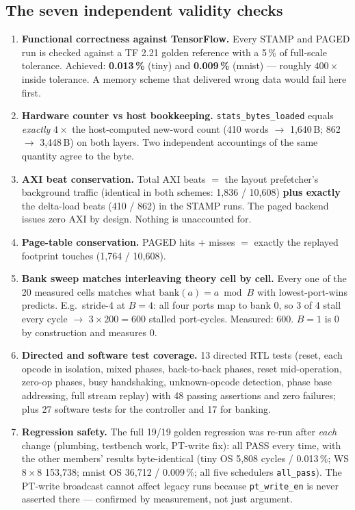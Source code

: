 \documentclass[11pt,a4paper]{article}
\newcommand{\file}[1]{\texttt{\small #1}}
\begin{document}
\subsection{The seven independent validity checks}

\begin{enumerate}[leftmargin=1.6em,itemsep=4pt]
  \item \textbf{Functional correctness against TensorFlow.} Every STAMP and
        PAGED run is checked against a TF 2.21 golden reference with a 5\,\%
        of full-scale tolerance. Achieved: \textbf{0.013\,\%} (tiny) and
        \textbf{0.009\,\%} (mnist) --- roughly $400\times$ inside tolerance. A
        memory scheme that delivered wrong data would fail here first.
  \item \textbf{Hardware counter vs host bookkeeping.}
        \file{stats\_bytes\_loaded} equals \emph{exactly} $4 \times$ the
        host-computed new-word count (410 words $\to$ 1{,}640\,B;
        862 $\to$ 3{,}448\,B) on both layers. Two independent accountings of
        the same quantity agree to the byte.
  \item \textbf{AXI beat conservation.} Total AXI beats $=$ the layout
        prefetcher's background traffic (identical in both schemes: 1{,}836 /
        10{,}608) \textbf{plus exactly} the delta-load beats (410 / 862) in the
        STAMP runs. The paged backend issues zero AXI by design. Nothing is
        unaccounted for.
  \item \textbf{Page-table conservation.} PAGED hits $+$ misses $=$ exactly the
        replayed footprint touches (1{,}764 / 10{,}608).
  \item \textbf{Bank sweep matches interleaving theory cell by cell.} Every one
        of the 20 measured cells matches what $\text{bank}(a) = a \bmod B$ with
        lowest-port-wins predicts. E.g.\ stride-4 at $B{=}4$: all four ports map
        to bank 0, so 3 of 4 stall every cycle $\to$ $3 \times 200 = 600$
        stalled port-cycles. Measured: 600. $B{=}1$ is 0 by construction and
        measures 0.
  \item \textbf{Directed and software test coverage.} 13 directed RTL tests
        (reset, each opcode in isolation, mixed phases, back-to-back phases,
        reset mid-operation, zero-op phases, busy handshaking, unknown-opcode
        detection, phase base addressing, full stream replay) with 48 passing
        assertions and zero failures; plus 27 software tests for the controller
        and 17 for banking.
  \item \textbf{Regression safety.} The full 19/19 golden regression was re-run
        after \emph{each} change (plumbing, testbench work, PT-write fix): all
        PASS every time, with the other members' results byte-identical (tiny OS
        5{,}808 cycles / 0.013\,\%; WS $8\times8$ 153{,}738; mnist OS 36{,}712 /
        0.009\,\%; all five schedulers \file{all\_pass}). The PT-write broadcast
        cannot affect legacy runs because \file{pt\_write\_en} is never asserted
        there --- confirmed by measurement, not just argument.
\end{enumerate}
\end{document}

